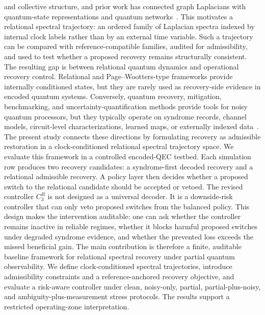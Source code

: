 \documentclass{iopjournal}
\begin{document}
and collective structure, and prior work has connected graph Laplacians with quantum-state 
representations and quantum networks~\cite{Braunstein2006GraphLaplacianDensityMatrix,Adhikari2017WeightedDigraphsQuantumStates,Biamonte2019ComplexNetworksQuantum}. 
This motivates a relational spectral trajectory: an ordered family of Laplacian spectra 
indexed by internal clock labels rather than by an external time variable. Such a trajectory 
can be compared with reference-compatible families, audited for admissibility, and used 
to test whether a proposed recovery remains structurally consistent.
The resulting gap is between relational quantum dynamics and operational recovery control. 
Relational and Page--Wootters-type frameworks provide internally conditioned states, 
but they are rarely used as recovery-side evidence in encoded quantum systems. 
Conversely, quantum recovery, mitigation, benchmarking, and uncertainty-quantification 
methods provide tools for noisy quantum processors, but they typically operate on 
syndrome records, channel models, circuit-level characterizations, learned maps, or 
externally indexed data~\cite{Hashim2025BenchmarkingCharacterization,Bennink2026UncertaintyQuantificationQC,Cieslinski2024RandomisedMeasurements}. 
The present study connects these directions by formulating recovery as admissible 
restoration in a clock-conditioned relational spectral trajectory space.
We evaluate this framework in a controlled encoded-QEC testbed. Each simulation row 
produces two recovery candidates: a syndrome-first decoded recovery and a relational 
admissible recovery. A policy layer then decides whether a proposed switch to the 
relational candidate should be accepted or vetoed. The revised controller \(C_3^R\) 
is not designed as a universal decoder. It is a downside-risk controller that can only 
veto proposed switches from the balanced policy. This design makes the intervention 
auditable: one can ask whether the controller remains inactive in reliable regimes, 
whether it blocks harmful proposed switches under degraded syndrome evidence, and 
whether the prevented loss exceeds the missed beneficial gain.
The main contribution is therefore a finite, auditable baseline framework for 
relational spectral recovery under partial quantum observability. We define 
clock-conditioned spectral trajectories, introduce admissibility constraints 
and a reference-anchored recovery objective, and evaluate a risk-aware controller 
under clean, noisy-only, partial, partial-plus-noisy, and ambiguity-plus-measurement 
stress protocols. The results support a restricted operating-zone interpretation. 
\end{document}
